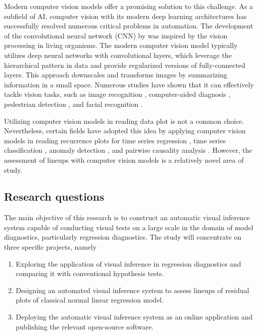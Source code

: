 \documentclass[11pt,a4paper,]{article}
\providecommand{\tightlist}{%
  \setlength{\itemsep}{0pt}\setlength{\parskip}{0pt}}
\begin{document}
Modern computer vision models offer a promising solution to this challenge. As a subfield of AI, computer vision with its modern deep learning architectures has successfully resolved numerous critical problems in automation. The development of the convolutional neural network (CNN) by \textcite{fukushima_neocognitron_1982} was inspired by the vision processing in living organisms. The modern computer vision model typically utilizes deep neural networks with convolutional layers, which leverage the hierarchical pattern in data and provide regularized versions of fully-connected layers. This approach downscales and transforms images by summarizing information in a small space. Numerous studies have shown that it can effectively tackle vision tasks, such as image recognition \autocite{rawat_deep_2017}, computer-aided diagnosis \autocite{lee_image_2015}, pedestrian detection \autocite{brunetti_computer_2018}, and facial recognition \autocite{emami_facial_2012}.

Utilizing computer vision models in reading data plot is not a common choice. Nevertheless, certain fields have adopted this idea by applying computer vision models in reading recurrence plots for time series regression \autocite{ojeda_multivariate_2020}, time series classification \autocite{chu_automatic_2019,hailesilassie_financial_2019,hatami_classification_2018,zhang_encoding_2020}, anomaly detection \autocite{chen_convolutional_2020}, and pairwise causality analysis \autocite{singh_deep_2017}. However, the assessment of lineups with computer vision models is a relatively novel area of study.

\hypertarget{research-questions}{%
\subsection{Research questions}\label{research-questions}}

The main objective of this research is to construct an automatic visual inference system capable of conducting visual tests on a large scale in the domain of model diagnostics, particularly regression diagnostics. The study will concentrate on three specific projects, namely

\begin{enumerate}
\def\labelenumi{\arabic{enumi}.}
\tightlist
\item
  Exploring the application of visual inference in regression diagnostics and comparing it with conventional hypothesis tests.
\item
  Designing an automated visual inference system to assess lineups of residual plots of classical normal linear regression model.
\item
  Deploying the automatic visual inference system as an online application and publishing the relevant open-source software.
\end{enumerate}
\end{document}
